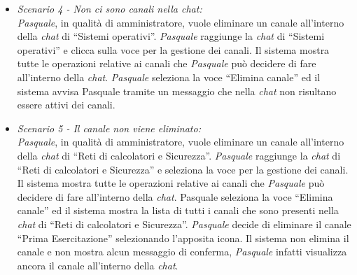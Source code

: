 \begin{itemize}
	\item \textit{Scenario 4 - Non ci sono canali nella chat:\\}
	\textit{Pasquale}, in qualità di amministratore, vuole eliminare un canale all’interno della \textit{chat} di “Sistemi operativi”. \textit{Pasquale} raggiunge la \textit{chat} di “Sistemi operativi” e clicca sulla voce per la gestione dei canali. Il sistema mostra tutte le operazioni relative ai canali che \textit{Pasquale} può decidere di fare all’interno della \textit{chat}. 
	\textit{Pasquale} seleziona la voce “Elimina canale” ed il sistema avvisa Pasquale tramite un messaggio che nella \textit{chat} non risultano essere attivi dei canali.\\
	
	\item \textit{Scenario 5 - Il canale non viene eliminato:\\}
	\textit{Pasquale}, in qualità di amministratore, vuole eliminare un canale all’interno della \textit{chat} di “Reti di calcolatori e Sicurezza”. \textit{Pasquale} raggiunge la \textit{chat} di “Reti di calcolatori e Sicurezza” e seleziona la voce per la gestione dei canali. Il sistema mostra tutte le operazioni relative ai canali che \textit{Pasquale} può decidere di fare all’interno della \textit{chat}. 
	Pasquale seleziona la voce “Elimina canale” ed il sistema mostra la lista di tutti i canali che sono presenti nella \textit{chat} di “Reti di calcolatori e Sicurezza”. \textit{Pasquale} decide di eliminare il canale “Prima Esercitazione” selezionando l’apposita icona. 
	Il sistema non elimina il canale e non mostra alcun messaggio di conferma, \textit{Pasquale} infatti visualizza ancora il canale all’interno della \textit{chat}. \\
\end{itemize}

